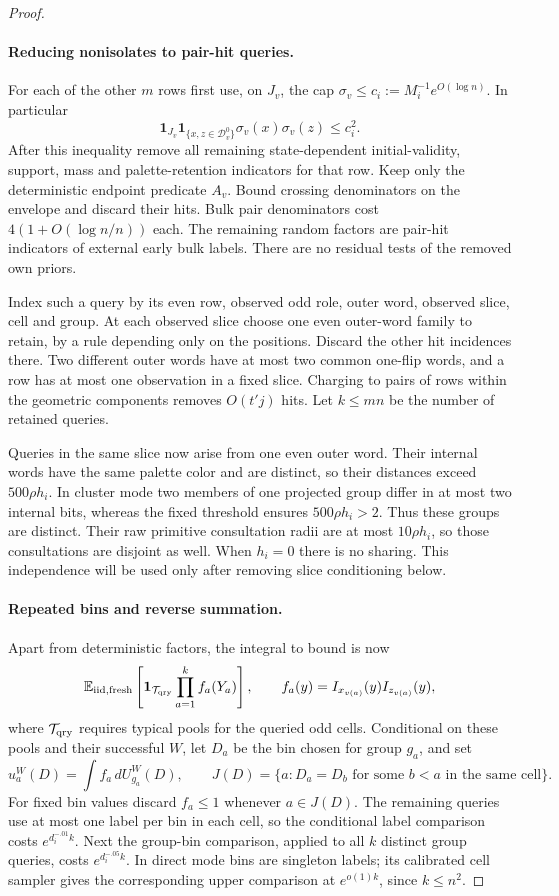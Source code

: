 \begin{proof}
\paragraph{Reducing nonisolates to pair-hit queries.}
For each of the other \(m\) rows first use, on \(J_v\), the cap
\(\sigma_v\le c_i:=M_i^{-1}e^{O(\log n)}\). In particular
\[
 \mathbf1_{J_v}\mathbf1_{\{x,z\in\mathcal D_v^0\}}
                   \sigma_v(x)\sigma_v(z)\le c_i^2.
\]
After this inequality remove all remaining state-dependent
initial-validity, support, mass and palette-retention indicators for
that row. Keep only the deterministic endpoint predicate \(A_v\).
Bound crossing denominators on the envelope and discard their hits.
Bulk pair denominators cost \(4(1+O(\log n/n))\) each. The remaining
random factors are pair-hit indicators of external early bulk labels.
There are no residual tests of the removed own priors.

Index such a query by its even row, observed odd role, outer word,
observed slice, cell and group. At each observed slice choose one even
outer-word family to retain, by a rule depending only on the positions.
Discard the other hit incidences there. Two different outer words have
at most two common one-flip words, and a row has at most one observation
in a fixed slice. Charging to pairs of rows within the geometric
components removes \(O(t'j)\) hits. Let \(k\le mn\) be the number
of retained queries.

Queries in the same slice now arise from one even outer word. Their
internal words have the same palette color and are distinct, so their
distances exceed \(500\rho h_i\). In cluster mode two members of
one projected group differ in at most two internal bits, whereas the
fixed threshold ensures \(500\rho h_i>2\). Thus these groups are
distinct. Their raw primitive consultation radii are at most
\(10\rho h_i\), so those consultations are disjoint as well. When
\(h_i=0\) there is no sharing. This independence will be used only
after removing slice conditioning below.

\paragraph{Repeated bins and reverse summation.}
Apart from deterministic factors, the integral to bound is now
\[
 \mathbb E_{\rm iid,fresh}
       \left[\mathbf1_{\mathcal T_{\rm qry}}\prod_{a=1}^k f_a(Y_a)\right],
 \qquad f_a(y)=I_{x_{v(a)}}(y)I_{z_{v(a)}}(y),
\]
where \(\mathcal T_{\rm qry}\) requires typical pools for the
queried odd cells. Conditional on these pools and their successful
\(W\), let \(D_a\) be the bin chosen for group \(g_a\), and set
\[
 u_a^W(D)=\int f_a\,dU_{g_a}^W(D),\qquad
 J(D)=\{a:D_a=D_b\text{ for some }b<a\text{ in the same cell}\}.
\]
For fixed bin values discard \(f_a\le1\) whenever \(a\in J(D)\).
The remaining queries use at most one label per bin in each cell, so
the conditional label comparison costs \(e^{d_i^{-.01}k}\).
Next the group-bin comparison, applied to all \(k\) distinct group
queries, costs \(e^{d_i^{-.05}k}\). In direct mode bins are singleton
labels; its calibrated cell sampler gives the corresponding upper
comparison at \(e^{o(1)k}\), since \(k\le n^2\).


\end{proof}

